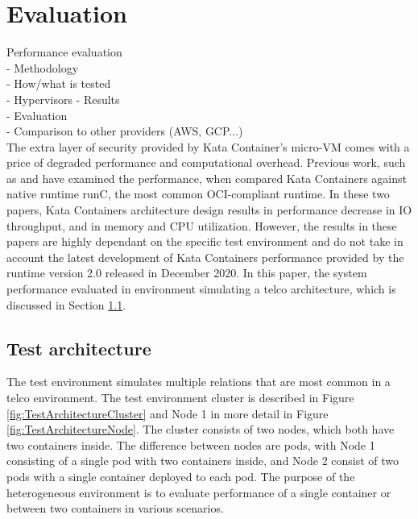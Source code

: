 \chapter{Evaluation}
\label{chapter:evaluation}

Performance evaluation \\
- Methodology \\
- How/what is tested \\
    - Hypervisors
- Results \\
- Evaluation \\
- Comparison to other providers (AWS, GCP...) \\






The extra layer of security provided by Kata Container's micro-VM comes with a price of degraded performance and computational overhead. Previous work, such as \cite{Kumar2020} and \cite{EverartsdeVelp2020} have examined the performance, when compared Kata Containers against native runtime runC, the most common OCI-compliant runtime. In these two papers, Kata Containers architecture design results in performance decrease in IO throughput, and in memory and CPU utilization. However, the results in these papers are highly dependant on the specific test environment and do not take in account the latest development of Kata Containers performance provided by the runtime version 2.0 released in December 2020. In this paper, the system performance evaluated in environment simulating a telco architecture, which is discussed in Section \ref{section:test_architecture}.

\section{Test architecture}
\label{section:test_architecture}

The test environment simulates multiple relations that are most common in a telco environment. The test environment cluster is described in Figure \ref{fig:TestArchitectureCluster} and Node 1 in more detail in Figure \ref{fig:TestArchitectureNode}. The cluster consists of two nodes, which both have two containers inside. The difference between nodes are pods, with Node 1 consisting of a single pod with two containers inside, and Node 2 consist of two pods with a single container deployed to each pod. The purpose of the heterogeneous environment is to evaluate performance of a single container or between two containers in various scenarios.

